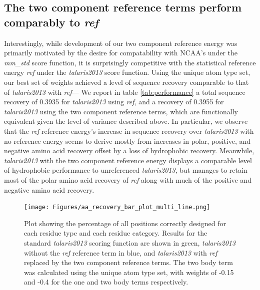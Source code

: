 \subsection{The two component reference terms perform comparably to \textit{ref}}
Interestingly, while development of our two component reference energy was primarily motivated by the desire for compatability with NCAA's under the \textit{mm\_std} score function, it is surprisingly competitive with the statistical reference energy \textit{ref} under the \textit{talaris2013} score function.
Using the unique atom type set, our best set of weights achieved a level of sequence recovery comparable to that of \textit{talaris2013} with \textit{ref}---
We report in table \ref{tab:performance} a total sequence recovery of 0.3935 for \textit{talaris2013} using \textit{ref}, and a recovery of 0.3955 for \textit{talaris2013} using the two component reference terms, which are functionally equivalent given the level of variance described above.
In particular, we observe that the \textit{ref} reference energy's increase in sequence recovery over \textit{talaris2013} with no reference energy seems to derive mostly from increases in polar, positive, and negative amino acid recovery offset by a loss of hydrophobic recovery.
Meanwhile, \textit{talaris2013} with the two component reference energy displays a comparable level of hydrophobic performance to unreferenced \textit{talaris2013}, but manages to retain most of the polar amino acid recovery of \textit{ref} along with much of the positive and negative amino acid recovery.

\begin{figure}[hbtp]
  \texttt{[image: Figures/aa\_recovery\_bar\_plot\_multi\_line.png]}
  \caption{Plot showing the percentage of all positions correctly designed for each residue type and each residue category.
Results for the standard \textit{talaris2013} scoring function are shown in green, \textit{talaris2013} without the \textit{ref} reference term in blue, and \textit{talaris2013} with \textit{ref} replaced by the two component reference terms.
The two body term was calculated using the unique atom type set, with weights of -0.15 and -0.4 for the one and two body terms respectively.}
  \label{fig:aa_recovery}
\end{figure}

